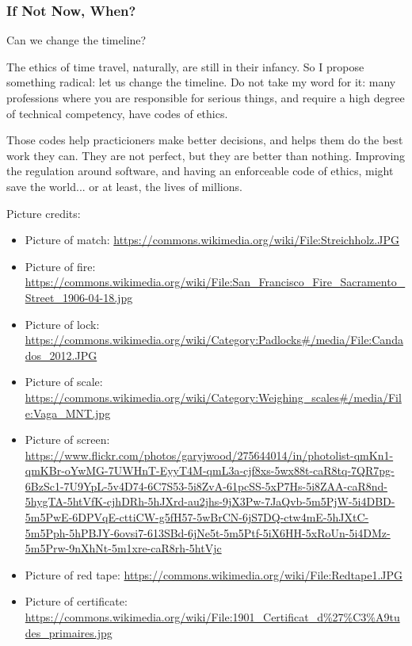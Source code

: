 \begin{frame}[fragile]
\frametitle{If Not Now, When?}

Can we change the timeline?

\end{frame}

The ethics of time travel,
naturally,
are still in their infancy.
So I propose something radical:
let us change the timeline.
Do not take my word for it:
many professions where you are responsible for serious things,
and require a high degree of technical competency,
have codes of ethics.

Those codes help practicioners make better decisions,
and helps them do the best work they can.
They are not perfect,
but they are better than nothing.
Improving the regulation around software,
and having an enforceable code of ethics,
might save the world...
or at least,
the lives of millions.



Picture credits:

\begin{itemize}
\item Picture of match: \url{https://commons.wikimedia.org/wiki/File:Streichholz.JPG}
\item Picture of fire: \url{https://commons.wikimedia.org/wiki/File:San_Francisco_Fire_Sacramento_Street_1906-04-18.jpg}
\item Picture of lock: \url{https://commons.wikimedia.org/wiki/Category:Padlocks#/media/File:Candados_2012.JPG}
\item Picture of scale: \url{https://commons.wikimedia.org/wiki/Category:Weighing_scales#/media/File:Vaga_MNT.jpg}
\item Picture of screen: \url{https://www.flickr.com/photos/garyjwood/275644014/in/photolist-qmKn1-qmKBr-oYwMG-7UWHnT-EyyT4M-qmL3a-cjf8xs-5wx88t-caR8tq-7QR7pg-6BzSc1-7U9YpL-5v4D74-6C7S53-5i8ZvA-61pcSS-5xP7Hs-5i8ZAA-caR8nd-5hygTA-5htVfK-cjhDRh-5hJXrd-au2jhs-9jX3Pw-7JaQvb-5m5PjW-5i4DBD-5m5PwE-6DPVqE-cttiCW-g5fH57-5wBrCN-6jS7DQ-ctw4mE-5hJXtC-5m5Pph-5hPBJY-6ovsi7-613SBd-6jNe5t-5m5Ptf-5iX6HH-5xRoUn-5i4DMz-5m5Prw-9nXhNt-5m1xre-caR8rh-5htVjc}
\item Picture of red tape: \url{https://commons.wikimedia.org/wiki/File:Redtape1.JPG}
\item Picture of certificate: \url{https://commons.wikimedia.org/wiki/File:1901_Certificat_d%27%C3%A9tudes_primaires.jpg}
\end{itemize}


